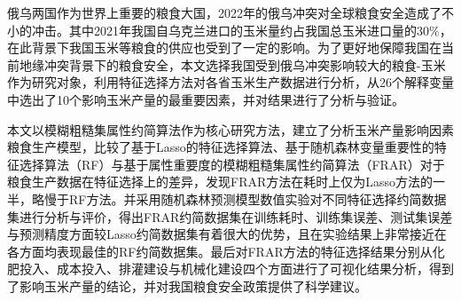 俄乌两国作为世界上重要的粮食大国，2022年的俄乌冲突对全球粮食安全造成了不小的冲击。其中2021年我国自乌克兰进口的玉米量约占我国总玉米进口量的30\%，在此背景下我国玉米等粮食的供应也受到了一定的影响。为了更好地保障我国在当前地缘冲突背景下的粮食安全，本文选择我国受到俄乌冲突影响较大的粮食-玉米作为研究对象，利用特征选择方法对各省玉米生产数据进行分析，从26个解释变量中选出了10个影响玉米产量的最重要因素，并对结果进行了分析与验证。

本文以模糊粗糙集属性约简算法作为核心研究方法，建立了分析玉米产量影响因素粮食生产模型，比较了基于Lasso的特征选择算法、基于随机森林变量重要性的特征选择算法（RF）与基于属性重要度的模糊粗糙集属性约简算法（FRAR）对于粮食生产数据在特征选择上的差异，发现FRAR方法在耗时上仅为Lasso方法的一半，略慢于RF方法。并采用随机森林预测模型数值实验对不同特征选择约简数据集进行分析与评价，得出FRAR约简数据集在训练耗时、训练集误差、测试集误差与预测精度方面较Lasso约简数据集有着很大的优势，且在实验结果上非常接近在各方面均表现最佳的RF约简数据集。最后对FRAR方法的特征选择结果分别从化肥投入、成本投入、排灌建设与机械化建设四个方面进行了可视化结果分析，得到了影响玉米产量的结论，并对我国粮食安全政策提供了科学建议。